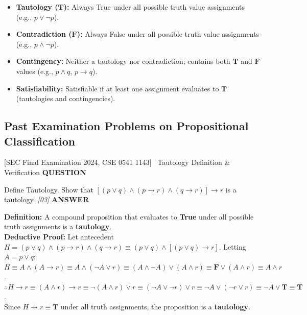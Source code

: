 \documentclass[11pt,a4paper]{article}
\newcommand{\Qlabel}{\textbf{\color{navy}\footnotesize\MakeUppercase{Question}}\par\smallskip}
\newcommand{\Alabel}{\textbf{\color{teal}\footnotesize\MakeUppercase{Answer}}\par\smallskip}
\begin{document}
\begin{defbox}
\begin{itemize}[leftmargin=1.2em,itemsep=1.5pt]
    \item \textbf{Tautology ($\mathbf{T}$):} Always True under all possible truth value assignments (e.g., $p \vee \neg p$).
    \item \textbf{Contradiction ($\mathbf{F}$):} Always False under all possible truth value assignments (e.g., $p \wedge \neg p$).
    \item \textbf{Contingency:} Neither a tautology nor contradiction; contains both $\mathbf{T}$ and $\mathbf{F}$ values (e.g., $p \wedge q$, $p \to q$).
    \item \textbf{Satisfiability:} Satisfiable if at least one assignment evaluates to $\mathbf{T}$ (tautologies and contingencies).
\end{itemize}
\end{defbox}

\subsection{Past Examination Problems on Propositional Classification}

\begin{exambox}{[SEC Final Examination 2024, CSE 0541 1143] \ Tautology Definition \& Verification}
\Qlabel
Define Tautology. Show that $[(p \vee q) \wedge (p \rightarrow r) \wedge (q \rightarrow r)] \rightarrow r$ is a tautology. \hfill\textit{[03]}
\tcblower
\Alabel
\textbf{Definition:} A compound proposition that evaluates to \textbf{True} under all possible truth assignments is a \textbf{tautology}.\\
\textbf{Deductive Proof:} Let antecedent $H = (p \lor q) \land (p \to r) \land (q \to r) \equiv (p \lor q) \land [(p \lor q) \to r]$. Letting $A = p \lor q$:\\
$H \equiv A \land (A \to r) \equiv A \land (\neg A \lor r) \equiv (A \land \neg A) \lor (A \land r) \equiv \mathbf{F} \lor (A \land r) \equiv A \land r$.\\[1pt]
$\therefore H \to r \equiv (A \land r) \to r \equiv \neg(A \land r) \lor r \equiv (\neg A \lor \neg r) \lor r \equiv \neg A \lor (\neg r \lor r) \equiv \neg A \lor \mathbf{T} \equiv \mathbf{T}$.\\
Since $H \to r \equiv \mathbf{T}$ under all truth assignments, the proposition is a \textbf{tautology}. \quad [Q.E.D.]
\end{exambox}
\end{document}
